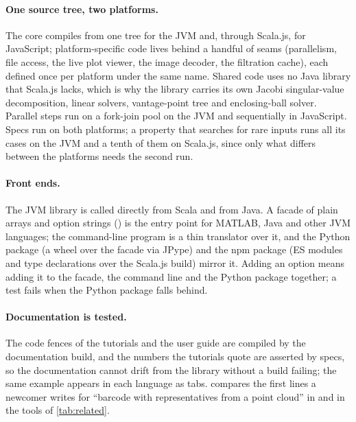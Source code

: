\paragraph{One source tree, two platforms.}
The core compiles from one tree for the JVM and, through Scala.js, for JavaScript; platform-specific code lives behind a
handful of seams (parallelism, file access, the live plot viewer, the image decoder, the filtration cache), each defined
once per platform under the same name. Shared code uses no Java library that Scala.js lacks, which is why the library
carries its own Jacobi singular-value decomposition, linear solvers, vantage-point tree and enclosing-ball solver.
Parallel steps run on a fork-join pool on the JVM and sequentially in JavaScript. Specs run on both platforms; a property
that searches for rare inputs runs all its cases on the JVM and a tenth of them on Scala.js, since only what differs between
the platforms needs the second run.

\paragraph{Front ends.}
The JVM library is called directly from Scala and from Java. A facade of plain arrays and option strings
() is the entry point for MATLAB, Java and other JVM languages; the command-line program is a thin
translator over it, and the Python package (a wheel over the facade via JPype) and the npm package (ES modules and type
declarations over the Scala.js build) mirror it. Adding an option means adding it to the facade, the command line and the
Python package together; a test fails when the Python package falls behind.

\paragraph{Documentation is tested.}
The code fences of the tutorials and the user guide are compiled by the documentation build, and the numbers the tutorials
quote are asserted by specs, so the documentation cannot drift from the library without a build failing; the same example
appears in each language as tabs.
  compares the first lines a newcomer writes for ``barcode with representatives from a point cloud'' in
\tdaj{} and in the tools of \cref{tab:related}.

